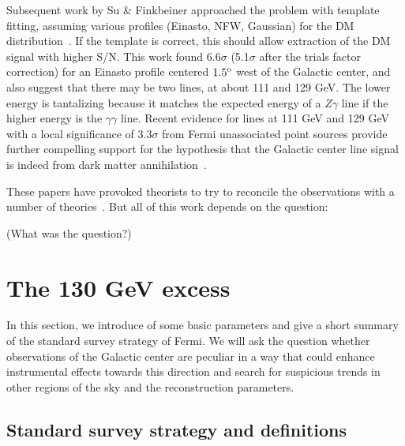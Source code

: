 \documentclass[aps,twocolumn,prd,superscriptaddress,showpacs,nofootinbib,fixfloat]{revtex4}
\newcommand{\degree}{^{\rm o}}
\begin{document}
Subsequent work by Su \& Finkbeiner approached the problem
with template fitting, assuming various profiles (Einasto,
NFW, Gaussian) for the DM distribution~\citep{linepaper}.
If the template is correct, this should allow extraction of
the DM signal with higher S/N.  This work found 6.6$\sigma$
(5.1$\sigma$ after the trials factor correction) for an
Einasto profile centered $1.5\degree$ west of the Galactic
center, and also suggest that there may be two lines, at
about 111 and 129 GeV.  The lower energy is tantalizing
because it matches the expected energy of a $Z\gamma$ line
if the higher energy is the $\gamma\gamma$ line.  Recent
evidence for lines at 111 GeV and 129 GeV with a local
significance of $3.3\sigma$ from Fermi unassociated point
sources provide further compelling support for the
hypothesis that the Galactic center line signal is indeed
from dark matter annihilation~\cite{doubleline}.

These papers have provoked theorists to try to reconcile the
observations with a number of theories~\citep{Dudas:2012,
Choi:2012, Kyae:2012, Lee:2012, Rajaraman:2012,
Acharya:2012, Garny:2012, Buckley:2012, Chu:2012, Kang:2012,
Buchmuller:2012, Heo:2012, Park:2012, Tulin:2012,
Cline:2012, Weiner:2012}.  But all of this work depends on
the question:

(What was the question?)



\section{The 130 GeV excess}
In this section, %
we introduce of some basic parameters and give a short
summary of the standard survey strategy of Fermi. We will
ask the question whether observations of the Galactic center
are peculiar in a way that could enhance instrumental
effects towards this direction and search for suspicious trends in
other regions of the sky and the reconstruction parameters.



\subsection{Standard survey strategy and definitions}
\label{sec:conventions}
\end{document}
